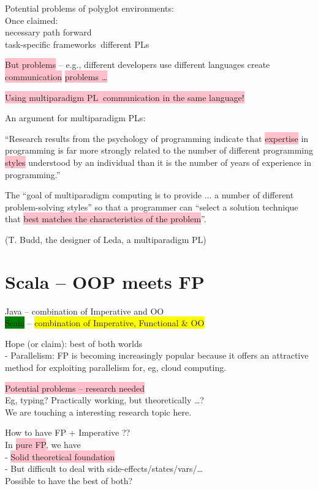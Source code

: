 \documentclass[tikz,border=10pt]{project_plan}
\begin{document}
Potential problems of polyglot environments:\\
Once claimed:\\
necessary path forward\\
task-specific frameworks \MVRightArrow$\ $different PLs

\colorbox{pink}{But problems} – e.g., different developers use
different languages create \colorbox{pink}{communication}
\colorbox{pink}{problems …}

\colorbox{pink}{
  Using multiparadigm PL \MVRightArrow$\ $communication in
  the same language!}

An argument for multiparadigm PLs:
\begin{mdframed}[style=MyQuoteFrame]
  “Research results from the psychology of programming indicate that
  \colorbox{pink}{expertise} in programming is far more strongly related to the number of
  different programming \colorbox{pink}{styles} understood by an individual than it is the
  number of years of experience in programming.”

  The “goal of multiparadigm computing is to provide ... a number of
  different problem-solving styles” so that a programmer can “select a
  solution technique that \colorbox{pink}{best matches the characteristics of the problem}”.
\end{mdframed}
(T. Budd, the designer of Leda, a multiparadigm PL)

\section{Scala – OOP meets FP}

Java – combination of Imperative and OO\\
\colorbox{green}{Scala} – \colorbox{yellow}{combination of Imperative, Functional \& OO}

Hope (or claim): best of both worlds\\
- Parallelism: FP is becoming increasingly popular because it offers an
attractive method for exploiting parallelism for, eg, cloud computing.

\colorbox{pink}{Potential problems – research needed}\\
Eg, typing? Practically working, but theoretically …?\\
We are touching a interesting research topic here.

How to have FP + Imperative ??\\
In \colorbox{pink}{pure FP}, we have\\
- \colorbox{pink}{Solid theoretical foundation}\\
- But difficult to deal with side-effects/states/vars/…\\
Possible to have the best of both?
\end{document}
